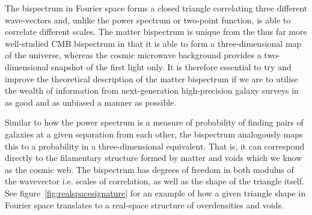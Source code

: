 The bispectrum in Fourier space forms a closed triangle correlating three different wave-vectors and, unlike the power spectrum or two-point function, is able to correlate different scales. The matter bispectrum is unique from the thus far more well-studied CMB bispectrum in that it is able to form a three-dimensional map of the universe, whereas the cosmic microwave background provides a two-dimensional snapshot of the first light only. It is therefore essential to try and improve the theoretical description of the matter bispectrum if we are to utilise the wealth of information from next-generation high-precision galaxy surveys in as good and as unbiased a manner as possible. 

Similar to how the power spectrum is a measure of probability of finding pairs of galaxies at a given separation from each other, the bispectrum analogously maps this to a probability in a three-dimensional equivalent. That is, it can correspond directly to the filamentary structure formed by matter and voids which we know as the cosmic web. The bispectrum has degrees of freedom in both modulus of the wavevector i.e. scales of correlation, as well as the shape of the triangle itself. See figure~\ref{fig:realspacesignature} for an example of how a given triangle shape in Fourier space translates to a real-space structure of overdensities and voids. 

